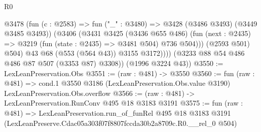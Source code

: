 \begin{lexlean}{R0}
\begin{coremodule}
                @3478
                  (fun (c : @2583) => fun ("_" : @3480) => @3428 (@3486 @3493) (@3449 @3485 @3493))
                  (@3406
                    (@3431
                      @3425
                      (@3436 @655 @486)
                      (fun (next : @2435) => @3219 (fun (state : @2435) => @3481 @504) @736 @504)))
                  (@2593 @501)
                  @504)
                @43
                @68
                (@553 (@564 @43))
                @3155
                @3172))))
        (@3233 @88 @54 @486 @486 @87 @507 (@3353 @87) @3308))
      (@1996 @3224 @43))
@3550 := LexLeanPreservation.Obs
@3551 := (raw : @481) -> @3550
@3560 := fun (raw : @481) =>
  cond.{1} @3550 @3186 (LexLeanPreservation.Obs.value @3190) LexLeanPreservation.Obs.overflow
@3566 := (raw : @481) -> LexLeanPreservation.RunConv @495 @18 @3183 @3191
@3575 := fun (raw : @481) =>
  LexLeanPreservation.run_of_funRel
    @495
    @18
    @3183
    @3191
    (LexLeanPreserve.Cdac05a303f07f8807fccda30b2a8709c.R0.__rel_0 @504)
\end{coremodule}
\end{lexlean}
